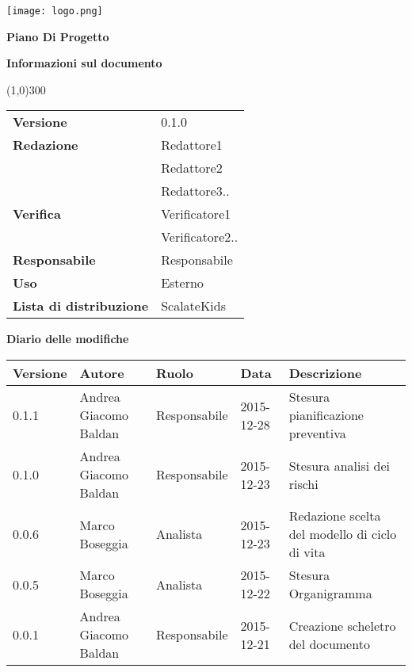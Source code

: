 \documentclass{scalatekids-article}
\begin{document}
\begin{titlepage}
  \centering
  \texttt{[image: logo.png]}\par\vspace{1cm}
  \vspace{1.5cm}
         {\Huge\bfseries Piano Di Progetto \par}
         \begin{center}
           \vspace{1.0cm}
                  {\large\bfseries Informazioni sul documento \par}
         \end{center}
         \vspace{-1cm}
         \begin{center}
           \line(1,0){300}
         \end{center}
         \vspace{0cm}
         \begin{tabular}[c]{l|l}
           \textbf{Versione} & 0.1.0\\
           \textbf{Redazione} & Redattore1\\ & Redattore2\\ & Redattore3..\\
           \textbf{Verifica} & Verificatore1\\ & Verificatore2..\\
           \textbf{Responsabile} & Responsabile\\
           \textbf{Uso} & Esterno\\
           \textbf{Lista di distribuzione} & ScalateKids
         \end{tabular}
\end{titlepage}
\clearpage
\setcounter{page}{1}
\begin{flushleft}
  \vspace{0cm}
         {\large\bfseries Diario delle modifiche \par}
\end{flushleft}
\vspace{0cm}
\begin{center}
  \begin{tabular}{| l | l | l | l | l |}
    \hline
    Versione & Autore & Ruolo & Data & Descrizione \\
    \hline
    0.1.1 & Andrea Giacomo Baldan & Responsabile & 2015-12-28 & Stesura pianificazione preventiva\\
    \hline
    0.1.0 & Andrea Giacomo Baldan & Responsabile & 2015-12-23 & Stesura analisi dei rischi \\
    \hline
    0.0.6 & Marco Boseggia & Analista & 2015-12-23 & Redazione scelta del modello di ciclo di vita\\
    \hline
    0.0.5 & Marco Boseggia & Analista & 2015-12-22 & Stesura Organigramma\\
    \hline
    0.0.1 & Andrea Giacomo Baldan & Responsabile & 2015-12-21 & Creazione scheletro del documento\\
    \hline
  \end{tabular}
\end{center}
\tableofcontents
\newpage
\end{document}
